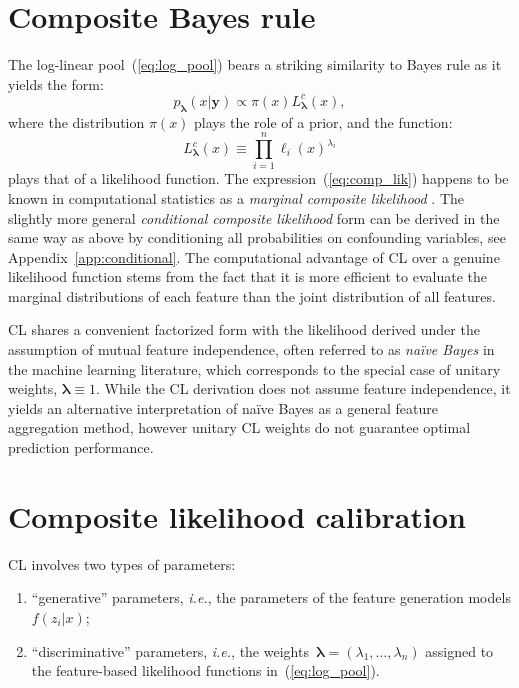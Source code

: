 \documentclass[english]{scrartcl}
\def\y{{\mathbf{y}}}
\newcommand{\blambda}{{\boldsymbol{\lambda}}}
\begin{document}


\section{Composite Bayes rule}
\label{sec:bayes_rule}

The log-linear pool~(\ref{eq:log_pool}) bears a striking similarity to Bayes rule as it yields the form: 
$$
p_\blambda(x|\y)\propto \pi(x) L^c_\blambda(x),
$$
where the distribution $\pi(x)$ plays the role of a prior, and the function:
\begin{equation}
\label{eq:comp_lik}
L^c_\blambda(x) \equiv \prod_{i=1}^n \ell_i (x)^{\lambda_i}
\end{equation} 
plays that of a likelihood function. The expression~(\ref{eq:comp_lik}) happens to be known in computational statistics as a {\em marginal composite likelihood} \cite{Varin-11}. The slightly more general {\em conditional composite likelihood} form can be derived in the same way as above by conditioning all probabilities on confounding variables, see Appendix~\ref{app:conditional}. The computational advantage of CL over a genuine likelihood function stems from the fact that it is more efficient to evaluate the marginal distributions of each feature than the joint distribution of all features.

CL shares a convenient factorized form with the likelihood derived under the assumption of mutual feature independence, often referred to as {\em na\"ive Bayes} in the machine learning literature, which corresponds to the special case of unitary weights, $\blambda\equiv 1$. While the CL derivation does not assume feature independence, it yields an alternative interpretation of na\"ive Bayes as a general feature aggregation method, however unitary CL weights do not guarantee optimal prediction performance.


\section{Composite likelihood calibration}
\label{sec:calibration}

CL involves two types of parameters:
\begin{enumerate}
    \item ``generative'' parameters, {\em i.e.}, the parameters of the feature generation models $f(z_i|x)$; 
    \item ``discriminative'' parameters, {\em i.e.},  the weights~$\blambda=(\lambda_1,\ldots,\lambda_n)$ assigned to the feature-based likelihood functions in~(\ref{eq:log_pool}).
\end{enumerate}
\end{document}
